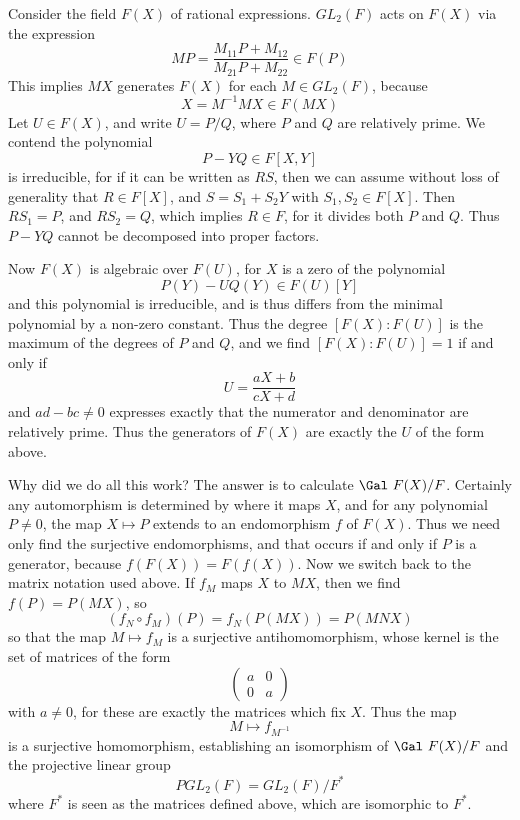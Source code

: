 \begin{example}
    Consider the field $F(X)$ of rational expressions. $GL_2(F)$ acts on $F(X)$ via the expression
    \[ M P = \frac{M_{11}P + M_{12}}{M_{21} P + M_{22}} \in F(P) \]
    This implies $MX$ generates $F(X)$ for each $M \in GL_2(F)$, because
    \[ X = M^{-1} MX \in F(MX) \]
    Let $U \in F(X)$, and write $U = P/Q$, where $P$ and $Q$ are relatively prime. We contend the polynomial
    \[ P - YQ \in F[X,Y] \]
    is irreducible, for if it can be written as $RS$, then we can assume without loss of generality that $R \in F[X]$, and $S = S_1 + S_2 Y$ with $S_1, S_2 \in F[X]$. Then $RS_1 = P$, and $RS_2 = Q$, which implies $R \in F$, for it divides both $P$ and $Q$. Thus $P - YQ$ cannot be decomposed into proper factors.

    Now $F(X)$ is algebraic over $F(U)$, for $X$ is a zero of the polynomial
    \[ P(Y) - U Q(Y) \in F(U)[Y] \]
    and this polynomial is irreducible, and is thus differs from the minimal polynomial by a non-zero constant. Thus the degree $[F(X): F(U)]$ is the maximum of the degrees of $P$ and $Q$, and we find $[F(X): F(U)] = 1$ if and only if
    \[ U = \frac{aX + b}{cX + d} \]
    and $ad - bc \neq 0$ expresses exactly that the numerator and denominator are relatively prime. Thus the generators of $F(X)$ are exactly the $U$ of the form above.

    Why did we do all this work? The answer is to calculate $\Gal\ F(X)/F$. Certainly any automorphism is determined by where it maps $X$, and for any polynomial $P \neq 0$, the map $X \mapsto P$ extends to an endomorphism $f$ of $F(X)$. Thus we need only find the surjective endomorphisms, and that occurs if and only if $P$ is a generator, because $f(F(X)) = F(f(X))$. Now we switch back to the matrix notation used above. If $f_M$ maps $X$ to $MX$, then we find $f(P) = P(MX)$, so
    \[ (f_N \circ f_M)(P) = f_N(P(MX)) = P(MNX) \]
    so that the map $M \mapsto f_M$ is a surjective antihomomorphism, whose kernel is the set of matrices of the form
    \[ \begin{pmatrix} a & 0 \\ 0 & a \end{pmatrix} \]
    with $a \neq 0$, for these are exactly the matrices which fix $X$. Thus the map
    \[ M \mapsto f_{M^{-1}} \]
    is a surjective homomorphism, establishing an isomorphism of $\Gal\ F(X)/F$ and the projective linear group
    \[ PGL_2(F) = GL_2(F)/F^* \]
    where $F^*$ is seen as the matrices defined above, which are isomorphic to $F^*$.
\end{example}

